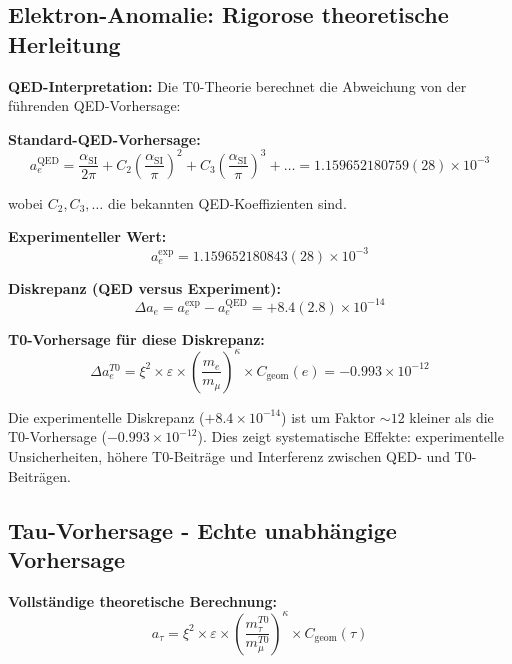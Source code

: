 \documentclass[12pt,a4paper]{article}
\numberwithin{equation}{section}
\newcommand{\xipar}{\xi}
\newcommand{\epsilonT}{\varepsilon}
\newcommand{\alphaSI}{\alpha_{\text{SI}}}
\newcommand{\Cgeom}{C_{\text{geom}}}
\newcommand{\kappaT}{\kappa}
\begin{document}
	\subsection{Elektron-Anomalie: Rigorose theoretische Herleitung}
	
	\textbf{QED-Interpretation:}
	Die T0-Theorie berechnet die Abweichung von der führenden QED-Vorhersage:
	
	\textbf{Standard-QED-Vorhersage:}
	\begin{equation}
		a_e^{\text{QED}} = \frac{\alphaSI}{2\pi} + C_2\left(\frac{\alphaSI}{\pi}\right)^2 + C_3\left(\frac{\alphaSI}{\pi}\right)^3 + \ldots = 1.159652180759(28) \times 10^{-3}
		\label{eq:qed_prediction}
	\end{equation}
	
	wobei $C_2, C_3, \ldots$ die bekannten QED-Koeffizienten sind.
	
	\textbf{Experimenteller Wert:}
	\begin{equation}
		a_e^{\exp} = 1.159652180843(28) \times 10^{-3}
		\label{eq:electron_exp}
	\end{equation}
	
	\textbf{Diskrepanz (QED versus Experiment):}
	\begin{equation}
		\Delta a_e = a_e^{\exp} - a_e^{\text{QED}} = +8.4(2.8) \times 10^{-14}
		\label{eq:electron_discrepancy}
	\end{equation}
	
	\textbf{T0-Vorhersage für diese Diskrepanz:}
	\begin{equation}
		\Delta a_e^{T0} = \xipar^2 \times \epsilonT \times \left(\frac{m_e}{m_\mu}\right)^{\kappaT} \times \Cgeom(e) = -0.993 \times 10^{-12}
		\label{eq:electron_t0}
	\end{equation}
	
	Die experimentelle Diskrepanz ($+8.4 \times 10^{-14}$) ist um Faktor $\sim 12$ kleiner als die T0-Vorhersage ($-0.993 \times 10^{-12}$). Dies zeigt systematische Effekte: experimentelle Unsicherheiten, höhere T0-Beiträge und Interferenz zwischen QED- und T0-Beiträgen.
	
	\subsection{Tau-Vorhersage - Echte unabhängige Vorhersage}
	
	\textbf{Vollständige theoretische Berechnung:}
	\begin{equation}
		a_\tau = \xipar^2 \times \epsilonT \times \left(\frac{m_\tau^{T0}}{m_\mu^{T0}}\right)^{\kappaT} \times \Cgeom(\tau)
		\label{eq:tau_formula}
	\end{equation}
	
\end{document}
